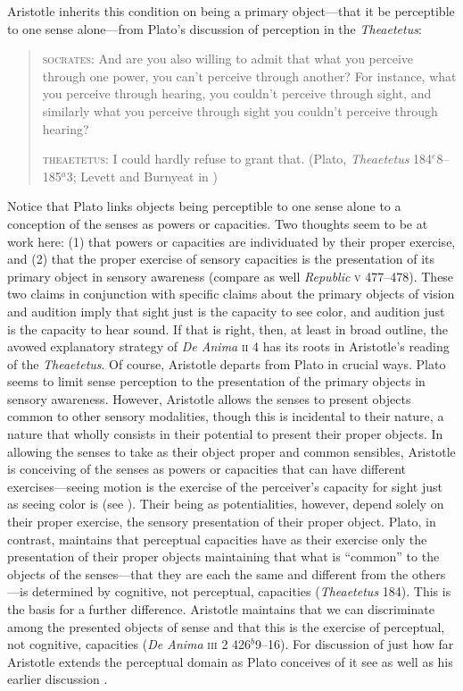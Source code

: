 Aristotle inherits this condition on being a primary object---that it be perceptible to one sense alone---from Plato's discussion of perception in the \emph{Theaetetus}:
\begin{quotation}
	\textsc{socrates}: And are you also willing to admit that what you perceive through one power, you can't perceive through another? For instance, what you perceive through hearing, you couldn't perceive through sight, and similarly what you perceive through sight you couldn't perceive through hearing?
	
	\textsc{theaetetus}: I could hardly refuse to grant that. (Plato, \emph{Theaetetus} 184\( ^{e} \)8--185\( ^{a} \)3; Levett and Burnyeat in \citealt[204]{Cooper:1997fk})
\end{quotation}
Notice that Plato links objects being perceptible to one sense alone to a conception of the senses as powers or capacities. Two thoughts seem to be at work here: (1) that powers or capacities are individuated by their proper exercise, and (2) that the proper exercise of sensory capacities is the presentation of its primary object in sensory awareness (compare as well \emph{Republic} \textsc{v} 477--478). These two claims in conjunction with specific claims about the primary objects of vision and audition imply that sight just is the capacity to see color, and audition just is the capacity to hear sound. If that is right, then, at least in broad outline, the avowed explanatory strategy of \emph{De Anima} \textsc{ii} 4 has its roots in Aristotle's reading of the \emph{Theaetetus}. Of course, Aristotle departs from Plato in crucial ways. Plato seems to limit sense perception to the presentation of the primary objects in sensory awareness. However, Aristotle allows the senses to present objects common to other sensory modalities, though this is incidental to their nature, a nature that wholly consists in their potential to present their proper objects. In allowing the senses to take as their object proper and common sensibles, Aristotle is conceiving of the senses as powers or capacities that can have different exercises---seeing motion is the exercise of the perceiver's capacity for sight just as seeing color is (see \citealt{Freeland:1986fp}). Their being as potentialities, however, depend solely on their proper exercise, the sensory presentation of their proper object. Plato, in contrast, maintains that perceptual capacities have as their exercise only the presentation of their proper objects maintaining that what is ``common'' to the objects of the senses---that they are each the same and different from the others---is determined by cognitive, not perceptual, capacities (\emph{Theaetetus} 184). This is the basis for a further difference. Aristotle maintains that we can discriminate among the presented objects of sense and that this is the exercise of perceptual, not cognitive, capacities (\emph{De Anima} \textsc{iii} 2 426\( ^{b} \)9--16). For discussion of just how far Aristotle extends the perceptual domain as Plato conceives of it see \citealt{Sorabji:2003fk} as well as his earlier discussion \citealt{Sorabji:1971fr}.

